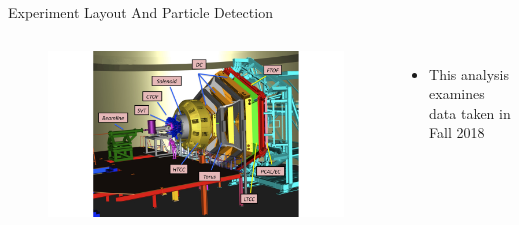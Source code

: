 \documentclass[aspectratio=169]{beamer}
\newcommand*{\myfont}{\fontfamily{lmtt}\selectfont}
\begin{document}
\begin{frame}{Experiment Layout And Particle Detection}
\begin{columns}[t, onlytextwidth]
                \vspace{0.3cm}
                \begin{figure}[t!]
                    \includegraphics[trim={8cm 1cm  8cm 1cm},width=.899\textwidth]{DNP/jlab_clas_layout_1.png}
                    

                    
                \end{figure}
                \begin{itemize}
                    \setlength\itemsep{.35em}
                    \item This analysis examines data taken in Fall 2018
                    \end{itemize}
                {\myfont{\tiny [V. Burkert et al., NIMA, 959, 163419 (2020)] }}
        \end{columns}
\end{frame}    


\end{document}
